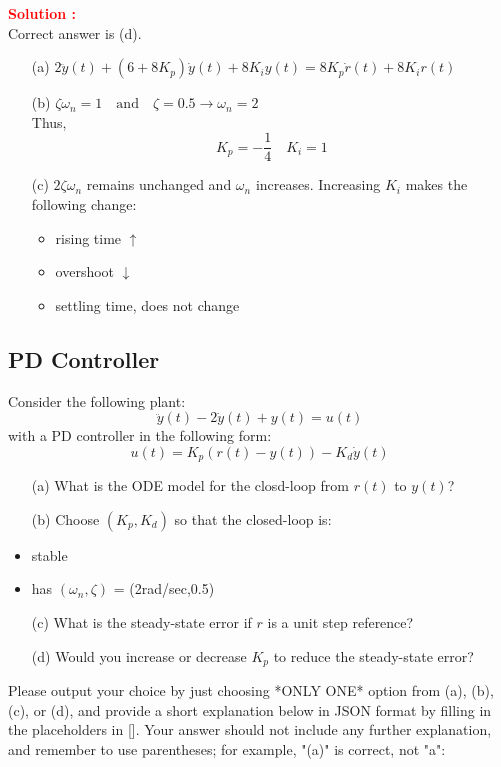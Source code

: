 \documentclass[12pt]{article}
\begin{document}
\textbf{\textcolor{red}{Solution :}} \\
Correct answer is (d).\\
\begin{itemize}
    \item[(a)] \(2\ddot{y}(t) + (6 + 8 K_p) \dot{y}(t) + 8 K_i y(t) = 8 K_p \dot{r}(t) + 8 K_i r(t) \)
    \item[(b)] \(\zeta \omega_n = 1 \quad \text{and} \quad \zeta = 0.5 \rightarrow \omega_n = 2\) \\
    Thus,
    \begin{equation}
        K_p = - \frac{1}{4} \quad K_i = 1
    \end{equation}
    \item[(c)] \(2\zeta \omega_n\) remains unchanged and \(\omega_n\) increases.
    Increasing \(K_i\) makes the following change:
    \begin{itemize}
        \item rising time \(\uparrow\)
        \item overshoot \(\downarrow\)
        \item settling time, does not change
    \end{itemize}
\end{itemize}
\clearpage

\subsection{PD Controller}

Consider the following plant:
\begin{equation}
    \ddot{y}(t) - 2\dot{y}(t) + y(t) = u(t)
\end{equation}
with a PD controller in the following form:
\begin{equation}
    u(t) = K_p(r(t)-y(t))-K_d \dot{y}(t)
\end{equation}
\begin{itemize}
    \item[(a)] What is the ODE model for the closd-loop from \(r(t)\) to \(y(t)\)?
    \item[(b)] Choose \((K_p,K_d)\) so that the closed-loop is: 
    \item stable
    \item has \((\omega_n,\zeta)\) = (2rad/sec,0.5)
    \item[(c)] What is the steady-state error if \(r\) is a unit step reference?
    \item[(d)] Would you increase or decrease \(K_p\) to reduce the steady-state error?
\end{itemize}
Please output your choice by just choosing *ONLY ONE* option from (a), (b), (c), or (d), and provide a short explanation below in JSON format by filling in the placeholders in []. Your answer should not include any further explanation, and remember to use parentheses; for example, "(a)" is correct, not "a":
\end{document}
